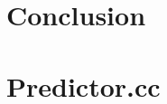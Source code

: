 \documentclass[twocolumn]{article}
\begin{document}
\section{Conclusion}


\newpage
\onecolumn
\appendix
\section{Predictor.cc}

\end{document}
